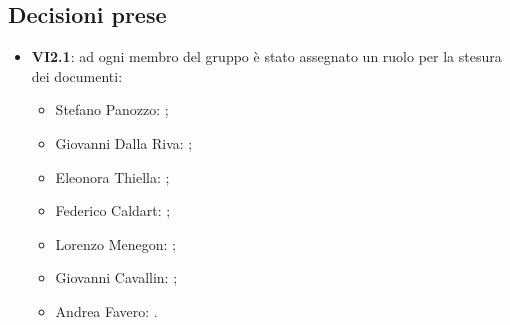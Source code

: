 	\subsection{Decisioni prese}
		\begin{itemize}
			\item \textbf{VI2.1}: ad ogni membro del gruppo è stato assegnato un ruolo per la stesura dei documenti:
			\begin{itemize}
				\item Stefano Panozzo: \RdP{};
				\item Giovanni Dalla Riva: \ana{};
				\item Eleonora Thiella: \ana{};
				\item Federico Caldart: \ana{};
				\item Lorenzo Menegon: \ver{};
				\item Giovanni Cavallin: \amm{};
				\item Andrea Favero: \amm{}.
			\end{itemize}
		\end{itemize}
